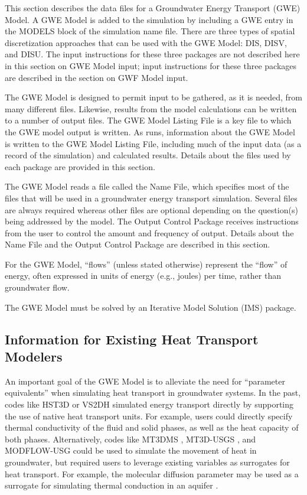 This section describes the data files for a \mf Groundwater Energy Transport (GWE) Model.  A GWE Model is added to the simulation by including a GWE entry in the MODELS block of the simulation name file.  There are three types of spatial discretization approaches that can be used with the GWE Model: DIS, DISV, and DISU.  The input instructions for these three packages are not described here in this section on GWE Model input; input instructions for these three packages are described in the section on GWF Model input.

The GWE Model is designed to permit input to be gathered, as it is needed, from many different files.  Likewise, results from the model calculations can be written to a number of output files. The GWE Model Listing File is a key file to which the GWE model output is written.  As \mf runs, information about the GWE Model is written to the GWE Model Listing File, including much of the input data (as a record of the simulation) and calculated results.  Details about the files used by each package are provided in this section.

The GWE Model reads a file called the Name File, which specifies most of the files that will be used in a groundwater energy transport simulation. Several files are always required whereas other files are optional depending on the question(s) being addressed by the model. The Output Control Package receives instructions from the user to control the amount and frequency of output.  Details about the Name File and the Output Control Package are described in this section.

For the GWE Model, ``flows'' (unless stated otherwise) represent the ``flow'' of energy, often expressed in units of energy (e.g., joules) per time, rather than groundwater flow.  

The GWE Model must be solved by an Iterative Model Solution (IMS) package.

\subsection{Information for Existing Heat Transport Modelers}
An important goal of the \mf GWE Model is to alleviate the need for ``parameter equivalents'' when simulating heat transport in groundwater systems.  In the past, codes like HST3D \citep{kipp1987} or VS2DH \citep{healy1996} simulated energy transport directly by supporting the use of native heat transport units.  For example, users could directly specify thermal conductivity of the fluid and solid phases, as well as the heat capacity of both phases.  Alternatively, codes like MT3DMS \citep{zheng1999mt3dms}, MT3D-USGS \citep{mt3dusgs}, and MODFLOW-USG \citep{modflowusg} could be used to simulate the movement of heat in groundwater, but required users to leverage existing variables as surrogates for heat transport.  For example, the molecular diffusion parameter may be used as a surrogate for simulating thermal conduction in an aquifer \citep{mazheng2010, hechtmendez}. 

